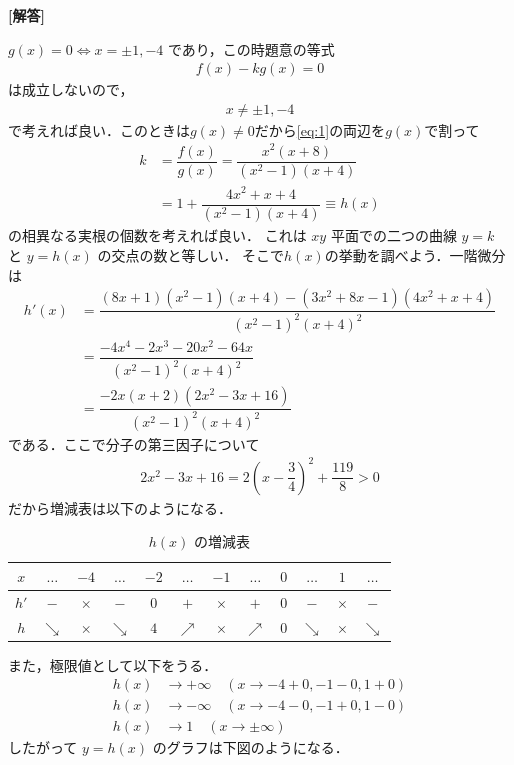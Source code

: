 \documentclass[../../main.tex]{subfiles}
\begin{document}
\begin{oframed}
  
\end{oframed}

{\bf [解答]}

$g(x) = 0 \iff x = \pm 1, -4$ であり，この時題意の等式
\begin{align}
  f(x) - k g(x) = 0 \label{eq:1}
\end{align}
は成立しないので，
\begin{align}
  x \neq \pm 1, -4 \label{eq:2}
\end{align}
で考えれば良い．このときは$g(x) \neq 0$だから\cref{eq:1}の両辺を$g(x)$で割って
\begin{align}
  k
  &= \dfrac{f(x)}{g(x)} = \dfrac{x^2(x+8)}{(x^2-1)(x+4)} \\
  &= 1 + \dfrac{4x^2+x+4}{(x^2-1)(x+4)} \equiv h(x) \label{eq:3}
\end{align}
の相異なる実根の個数を考えれば良い．
これは $xy$ 平面での二つの曲線 $y=k$ と $y=h(x)$ の交点の数と等しい．
そこで$h(x)$の挙動を調べよう．一階微分は
\begin{align}
  h'(x)
  &= \dfrac{(8x+1)(x^2-1)(x+4) - (3x^2+8x-1)(4x^2+x+4)}{(x^2-1)^2 (x+4)^2} \\
  &= \dfrac{-4x^4 - 2x^3 - 20x^2 - 64x}{(x^2-1)^2 (x+4)^2} \\
  &= \dfrac{-2x(x+2)(2x^2 - 3x + 16)}{(x^2-1)^2 (x+4)^2}
\end{align}
である．ここで分子の第三因子について
\begin{align}
  2x^2 - 3x + 16 = 2\left(x - \dfrac{3}{4}\right)^2 + \dfrac{119}{8} > 0
\end{align}
だから増減表は以下のようになる．

\begin{table}[htb]
  \centering
  \caption{$h(x)$ の増減表}
  \begin{tabular}{c|c|c|c|c|c|c|c|c|c|c|c}
    $x$ & $\dots$ & $-4$ & $\dots$ & $-2$ & $\dots$ & $-1$ & $\dots$ & $0$ & $\dots$ & $1$ & $\dots$ \\ \hline
    $h'$ & $-$ & $\times$ & $-$ & $0$ & $+$ & $\times$ & $+$ & $0$ & $-$ & $\times$ & $-$ \\ \hline
    $h$ & $\searrow$ & $\times$ & $\searrow$ & $4$ & $\nearrow$ & $\times$ & $\nearrow$ & $0$ & $\searrow$ & $\times$ & $\searrow$
  \end{tabular}
\end{table}

また，極限値として以下をうる．
\begin{align}
  h(x) &\to +\infty \quad (x \to -4+0, -1-0, 1+0) \\
  h(x) &\to -\infty \quad (x \to -4-0, -1+0, 1-0) \\
  h(x) &\to 1 \quad (x \to \pm\infty)
\end{align}
したがって $y=h(x)$ のグラフは下図のようになる．
\end{document}
